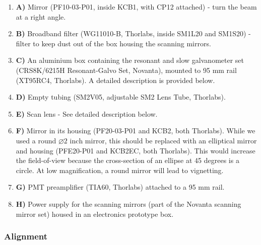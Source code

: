\documentclass[10pt,letterpaper]{article}
\begin{document}
\begin{enumerate}[]
    \item \textbf{A)} Mirror (PF10-03-P01, inside KCB1, with CP12 attached) - turn the beam at a right angle.
    \item \textbf{B)} Broadband filter (WG11010-B, Thorlabs, inside SM1L20 and SM1S20) - filter to keep dust out of the box housing the scanning mirrors.
    \item \textbf{C)} An aluminium box containing the resonant and slow galvanometer set (CRS8K/6215H Resonant-Galvo Set, Novanta), mounted to 95 mm rail (XT95RC4, Thorlabs). A detailed description is provided below.
    \item \textbf{D)} Empty tubing (SM2V05, adjustable SM2 Lens Tube, Thorlabs).
    \item \textbf{E)} Scan lens - See detailed description below.
    \item \textbf{F)} Mirror in its housing (PF20-03-P01 and KCB2, both Thorlabs). While we used a round $\diameter2\text{ inch}$ mirror, this should be replaced with an elliptical mirror and housing (PFE20-P01 and KCB2EC, both Thorlabs). This would increase the field-of-view because the cross-section of an ellipse at 45 degrees is a circle. At low magnification, a round mirror will lead to vignetting.
    \item \textbf{G)} PMT preamplifier (TIA60, Thorlabs) attached to a 95 mm rail.
    \item \textbf{H)} Power supply for the scanning mirrors (part of the Novanta scanning mirror set) housed in an electronics prototype box.
\end{enumerate}

\subsubsection{Alignment}
\end{document}

